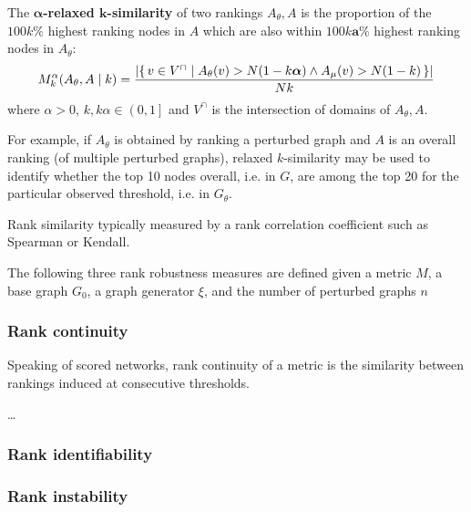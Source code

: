 \begin{definition}
    The \textbf{$\bm{\alpha}$-relaxed $\bm{k}$-similarity} of two rankings $A_\theta, A$ is the proportion of the $100k\%$ highest ranking nodes in $A$ which are also within $100k\bm{a}\%$ highest ranking nodes in $A_\theta$:
    \[ M_k^\alpha(A_\theta, A \mid k) = \frac{\left\lvert \left\{\, v \in V^{\cap} \mid  A_\theta(v) > N(1-k\bm{\alpha}) \wedge A_\mu(v) > N(1-k)  \, \right\} \right\rvert}{Nk} \]
    where $\alpha > 0$, $k, k\alpha \in \left( 0, 1 \right]$ and $V^{\cap}$ is the intersection of domains of $A_\theta, A$.
\end{definition}

For example, if $A_\theta$ is obtained by ranking a perturbed graph and $A$ is an overall ranking (of multiple perturbed graphs), relaxed $k$-similarity may be used to identify whether the top 10 nodes overall, i.e. in $G$, are among the top 20 for the particular observed threshold, i.e. in $G_\theta$.


 Rank similarity typically measured by a rank correlation coefficient such as Spearman or Kendall.

\parspace

The following three rank robustness measures are defined given a metric $M$, a base graph $G_0$, a graph generator $\xi$, and the number of perturbed graphs $n$

\subsubsection{Rank continuity}\label{sub:rank_continuity}

Speaking of scored networks, rank continuity of a metric is the similarity between rankings induced at consecutive thresholds.

\ldots

\subsubsection{Rank identifiability}

\subsubsection{Rank instability}


